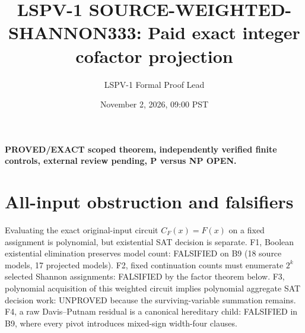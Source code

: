 \documentclass[11pt]{article}
\title{LSPV-1 SOURCE-WEIGHTED-SHANNON333: Paid exact integer cofactor projection}
\author{LSPV-1 Formal Proof Lead}
\date{November 2, 2026, 09:00 PST}
\begin{document}
\maketitle
\noindent\textbf{PROVED/EXACT scoped theorem, independently verified finite controls, external review pending, P versus NP OPEN.}

\section{All-input obstruction and falsifiers}
Evaluating the exact original-input circuit $C_F(x)=F(x)$ on a fixed assignment is polynomial, but existential SAT decision is separate. F1, Boolean existential elimination preserves model count: FALSIFIED on B9 (18 source models, 17 projected models). F2, fixed continuation counts must enumerate $2^k$ selected Shannon assignments: FALSIFIED by the factor theorem below. F3, polynomial acquisition of this weighted circuit implies polynomial aggregate SAT decision work: UNPROVED because the surviving-variable summation remains. F4, a raw Davis--Putnam residual is a canonical hereditary child: FALSIFIED in B9, where every pivot introduces mixed-sign width-four clauses.
\end{document}
